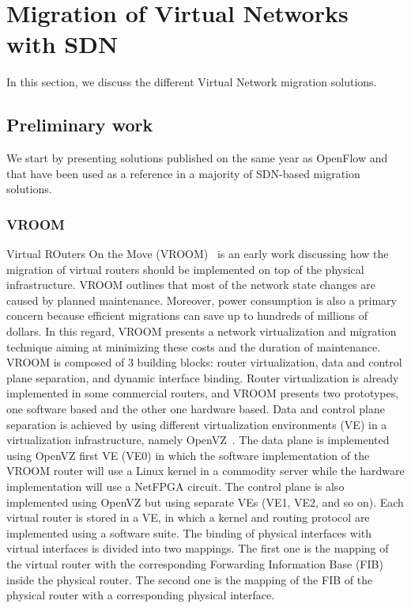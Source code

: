 \section{Migration of Virtual Networks with SDN}
\label{sec:sota-vnmigration}
In this section, we discuss the different Virtual Network migration solutions.


\subsection{Preliminary work}

We start by presenting solutions published on the same year as OpenFlow and that have been used as a reference in a majority of SDN-based migration solutions.

\subsubsection{VROOM}
Virtual ROuters On the Move (VROOM)~\cite{VROOM-Wang2008} is an early work discussing how the migration of virtual routers should be implemented on top of the physical infrastructure. 
VROOM outlines that most of the network state changes are caused by planned maintenance.
Moreover, power consumption is also a primary concern because efficient migrations can save up to hundreds of millions of dollars.
In this regard, VROOM presents a network virtualization and migration technique aiming at minimizing these costs and the duration of maintenance.
VROOM is composed of 3 building blocks: router virtualization, data and control plane separation, and dynamic interface binding.
Router virtualization is already implemented in some commercial routers, and VROOM presents two prototypes, one software based and the other one hardware based.
Data and control plane separation is achieved by using different virtualization environments (VE) in a virtualization infrastructure, namely OpenVZ~\cite{openvz}.
The data plane is implemented using OpenVZ first VE (VE0) in which the software implementation of the VROOM router will use a Linux kernel in a commodity server while the hardware implementation will use a NetFPGA circuit.
The control plane is also implemented using OpenVZ but using separate VEs (VE1, VE2, and so on).
Each virtual router is stored in a VE, in which a kernel and routing protocol are implemented using a software suite.
The binding of physical interfaces with virtual interfaces is divided into two mappings.
The first one is the mapping of the virtual router with the corresponding Forwarding Information Base (FIB) inside the physical router.
The second one is the mapping of the FIB of the physical router with a corresponding physical interface.

